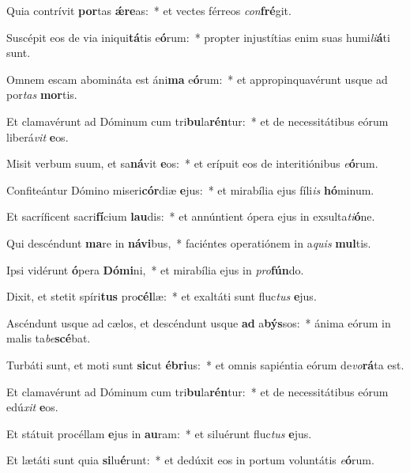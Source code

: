 \item Quia contrívit \textbf{por}tas \textbf{ǽ}\textbf{re}as:~* et vectes férreos \textit{con}\textbf{fré}git.
\item Suscépit eos de via iniqui\textbf{tá}tis e\textbf{ó}rum:~* propter injustítias enim suas humi\textit{li}\textbf{á}ti sunt.
\item Omnem escam abomináta est áni\textbf{ma} e\textbf{ó}rum:~* et appropinquavérunt usque ad por\textit{tas} \textbf{mor}tis.
\item Et clamavérunt ad Dóminum cum tri\textbf{bu}la\textbf{rén}tur:~* et de necessitátibus eórum liberá\textit{vit} \textbf{e}os.
\item Misit verbum suum, et sa\textbf{ná}vit \textbf{e}os:~* et erípuit eos de interitiónibus \textit{e}\textbf{ó}rum.
\item Confiteántur Dómino miseri\textbf{cór}diæ \textbf{e}jus:~* et mirabília ejus fíli\textit{is} \textbf{hó}minum.
\item Et sacríficent sacri\textbf{fí}cium \textbf{lau}dis:~* et annúntient ópera ejus in exsulta\textit{ti}\textbf{ó}ne.
\item Qui descéndunt \textbf{ma}re in \textbf{ná}\textbf{vi}bus,~* faciéntes operatiónem in a\textit{quis} \textbf{mul}tis.
\item Ipsi vidérunt \textbf{ó}pera \textbf{Dó}\textbf{mi}ni,~* et mirabília ejus in \textit{pro}\textbf{fún}do.
\item Dixit, et stetit spíri\textbf{tus} pro\textbf{cél}læ:~* et exaltáti sunt fluc\textit{tus} \textbf{e}jus.
\item Ascéndunt usque ad cælos, et descéndunt usque \textbf{ad} a\textbf{býs}sos:~* ánima eórum in malis ta\textit{be}\textbf{scé}bat.
\item Turbáti sunt, et moti sunt \textbf{sic}ut \textbf{é}\textbf{bri}us:~* et omnis sapiéntia eórum de\textit{vo}\textbf{rá}ta est.
\item Et clamavérunt ad Dóminum cum tri\textbf{bu}la\textbf{rén}tur:~* et de necessitátibus eórum edú\textit{xit} \textbf{e}os.
\item Et státuit procéllam \textbf{e}jus in \textbf{au}ram:~* et siluérunt fluc\textit{tus} \textbf{e}jus.
\item Et lætáti sunt quia \textbf{si}lu\textbf{é}runt:~* et dedúxit eos in portum voluntátis \textit{e}\textbf{ó}rum.
